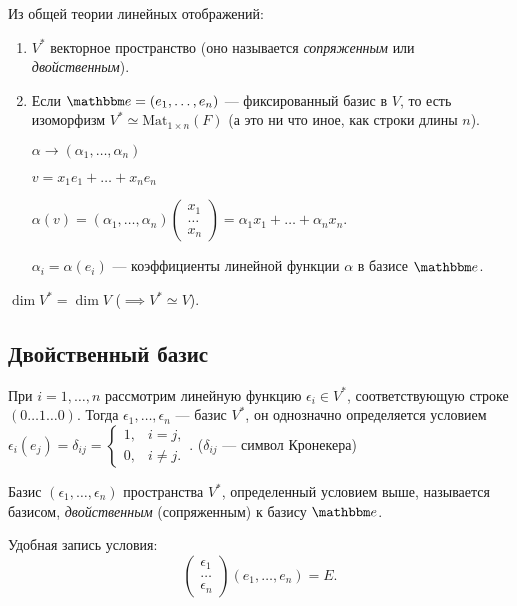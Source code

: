 Из общей теории линейных отображений:
\begin{enumerate}
\item $V^{*}$ векторное пространство (оно называется \textit{сопряженным} или \textit{двойственным}).
\item Если $\E = (e_1, \dots, e_n)$ --- фиксированный базис в $V$, то есть изоморфизм $V^{*} \simeq \text{Mat}_{1 \times n}(F)$ (а это ни что иное, как строки длины $n$).

    $\alpha \to (\alpha_1, \dots, \alpha_n)$

    $v = x_1 e_1 + \dots + x_n e_n$

    $\alpha(v) = (\alpha_1, \dots, \alpha_n) \begin{pmatrix} x_1 \\ \dots \\ x_n \end{pmatrix} = \alpha_1 x_1 + \dots + \alpha_n x_n$.

    $\alpha_i = \alpha(e_i)$ --- коэффициенты линейной функции $\alpha$ в базисе $\E$.
\end{enumerate}

\begin{corollary}
    $\dim V^{*} = \dim V$ ($\implies V^{*} \simeq V$).
\end{corollary}


\subsection{Двойственный базис}

При $i = 1, \dots, n$ рассмотрим линейную функцию $\epsilon_i \in V^{*}$, соответствующую строке $(0 \dots 1 \dots 0)$. Тогда $\epsilon_1, \dots, \epsilon_n$ --- базис $V^{*}$, он однозначно определяется условием $\epsilon_i(e_j) = \delta_{ij} = \begin{cases}
    1, &i = j, \\
    0, &i \neq j.
\end{cases}$. ($\delta_{ij}$ --- символ Кронекера)


\begin{definition}
    Базис $(\epsilon_1, \dots, \epsilon_n)$ пространства $V^{*}$, определенный условием выше, называется базисом, \textit{двойственным} (сопряженным) к базису $\E$.

    Удобная запись условия:
    \begin{equation*}
        \begin{pmatrix} \epsilon_1 \\ \dots \\ \epsilon_n \end{pmatrix} (e_1, \dots, e_n) = E
    .\end{equation*}
\end{definition}
